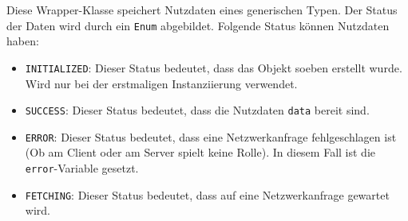 \begin{Shaded}
\begin{Highlighting}[]
 

     


     


      \NormalTok{() \{}
\NormalTok{    \}}

    \NormalTok{() \{}
\NormalTok{    \}}

      \NormalTok{() \{}
\NormalTok{    \}}

      \NormalTok{ \{}
\NormalTok{    \}}
\NormalTok{\}}
\end{Highlighting}
\end{Shaded}

Diese Wrapper-Klasse speichert Nutzdaten eines generischen Typen. Der
Status der Daten wird durch ein \texttt{Enum} abgebildet. Folgende
Status können Nutzdaten haben:

\begin{itemize}
\tightlist
\item
  \texttt{INITIALIZED}: Dieser Status bedeutet, dass das Objekt soeben
  erstellt wurde. Wird nur bei der erstmaligen Instanziierung verwendet.
\item
  \texttt{SUCCESS}: Dieser Status bedeutet, dass die Nutzdaten
  \texttt{data} bereit sind.
\item
  \texttt{ERROR}: Dieser Status bedeutet, dass eine Netzwerkanfrage
  fehlgeschlagen ist (Ob am Client oder am Server spielt keine Rolle).
  In diesem Fall ist die \texttt{error}-Variable gesetzt.
\item
  \texttt{FETCHING}: Dieser Status bedeutet, dass auf eine
  Netzwerkanfrage gewartet wird.
\end{itemize}

